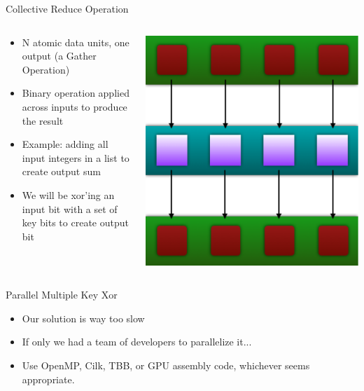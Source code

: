 \documentclass[xcolor=dvipsnames]{beamer}
\begin{document}
  \begin{frame}{Collective Reduce Operation}
		\begin{columns}
			\begin{column}{0.5\textwidth}
				\begin{itemize}
					\item N atomic data units, one output (a Gather Operation)
					\item Binary operation applied across inputs to produce the result
					\item Example: adding all input integers in a list to create output sum
          \item We will be xor'ing an input bit with a set of key bits to create output bit
				\end{itemize}
			\end{column}
			\begin{column}{0.5\textwidth}
				\includegraphics[width=\textwidth]{images/mapPattern}
			\end{column}
		\end{columns}
	\end{frame}
	
	
	\begin{frame}{Parallel Multiple Key Xor}
		\begin{itemize}
			\item Our solution is way too slow
			\item If only we had a team of developers to parallelize it...
      \item Use OpenMP, Cilk, TBB, or GPU assembly code, whichever seems appropriate.
		\end{itemize}
	\end{frame}
	
\end{document}
